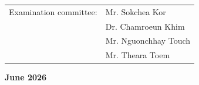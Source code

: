 \begin{titlepage}
    {\englishfont
    \begin{center}
        \begin{tabular}{ll}
            {Examination committee:} & Mr. Sokchea Kor \\
                                    & Dr. Chamroeun Khim\\
                                    & Mr. Nguonchhay Touch\\
                                    & Mr. Theara Toem\\
        \end{tabular}
    \end{center}
    }

    \vfill
    {\englishfont\fontsize{20pt}{20pt}\Large\bfseries June 2026\par}
\end{titlepage}
